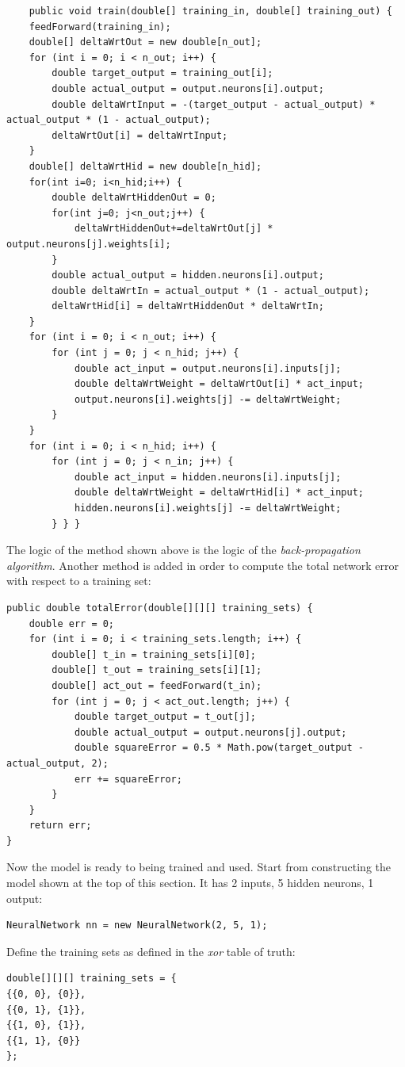 \documentclass[10pt,a4paper]{article}
\begin{document}
\begin{lstlisting}
	public void train(double[] training_in, double[] training_out) {
	feedForward(training_in);
	double[] deltaWrtOut = new double[n_out];
	for (int i = 0; i < n_out; i++) {
		double target_output = training_out[i];
		double actual_output = output.neurons[i].output;
		double deltaWrtInput = -(target_output - actual_output) * actual_output * (1 - actual_output);
		deltaWrtOut[i] = deltaWrtInput;
	}
	double[] deltaWrtHid = new double[n_hid];
	for(int i=0; i<n_hid;i++) {
		double deltaWrtHiddenOut = 0;
		for(int j=0; j<n_out;j++) {
			deltaWrtHiddenOut+=deltaWrtOut[j] * output.neurons[j].weights[i];
		}
		double actual_output = hidden.neurons[i].output;
		double deltaWrtIn = actual_output * (1 - actual_output);
		deltaWrtHid[i] = deltaWrtHiddenOut * deltaWrtIn;
	}
	for (int i = 0; i < n_out; i++) {
		for (int j = 0; j < n_hid; j++) {
			double act_input = output.neurons[i].inputs[j];
			double deltaWrtWeight = deltaWrtOut[i] * act_input;
			output.neurons[i].weights[j] -= deltaWrtWeight;
		}
	}
	for (int i = 0; i < n_hid; i++) {
		for (int j = 0; j < n_in; j++) {
			double act_input = hidden.neurons[i].inputs[j];
			double deltaWrtWeight = deltaWrtHid[i] * act_input;
			hidden.neurons[i].weights[j] -= deltaWrtWeight;
		} } }
\end{lstlisting}
The logic of the method shown above is the logic of the \emph{back-propagation algorithm}. Another method is added in order to compute the total network error with respect to a training set:
\begin{lstlisting}
public double totalError(double[][][] training_sets) {
	double err = 0;
	for (int i = 0; i < training_sets.length; i++) {
		double[] t_in = training_sets[i][0];
		double[] t_out = training_sets[i][1];
		double[] act_out = feedForward(t_in);
		for (int j = 0; j < act_out.length; j++) {
			double target_output = t_out[j];
			double actual_output = output.neurons[j].output;
			double squareError = 0.5 * Math.pow(target_output - actual_output, 2);
			err += squareError;
		}
	}
	return err;
}
\end{lstlisting}
Now the model is ready to being trained and used. Start from constructing the model shown at the top of this section. It has 2 inputs, 5 hidden neurons, 1 output:
\begin{lstlisting}
NeuralNetwork nn = new NeuralNetwork(2, 5, 1);
\end{lstlisting}
Define the training sets as defined in the \emph{xor} table of truth:
\begin{lstlisting}
double[][][] training_sets = {
{{0, 0}, {0}},
{{0, 1}, {1}},
{{1, 0}, {1}},
{{1, 1}, {0}}
};
\end{lstlisting}
\end{document}
